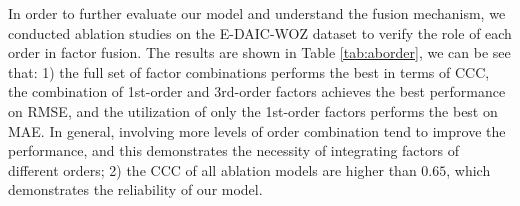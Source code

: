 \documentclass{article}
\begin{document}
In order to further evaluate our model and understand the fusion mechanism, we conducted ablation studies on the E-DAIC-WOZ dataset to verify the role of each order in factor fusion.
The results are shown in Table \ref{tab:aborder}, we can be see that: 1) the full set of factor combinations performs the best in terms of CCC, the combination of 1st-order and 3rd-order factors achieves the best performance on RMSE, and the utilization of only the 1st-order factors performs the best on MAE. In general, involving more levels of order combination tend to improve the performance, and this demonstrates the necessity of integrating factors of different orders; 2) the CCC of all ablation models are higher than $0.65$, which demonstrates the reliability of our model.

\end{document}
